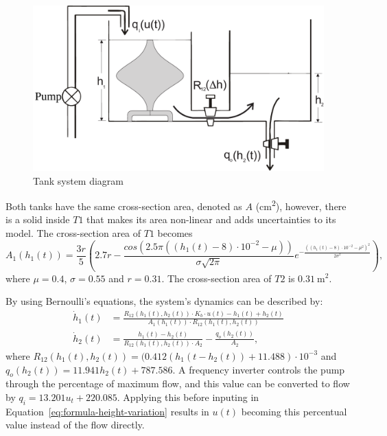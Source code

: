 \begin{figure}[ht!]
  \centering \captionsetup{justification=centering}
  \includegraphics[width=0.9\linewidth]{imgs/tanks}
  \caption{Tank system diagram}%
  \label{fig:tanks}
\end{figure}

Both tanks have the same cross-section area, denoted as \(A\)
(\si{\square\centi\metre}), however, there is a solid inside \(T1\) that makes its
area non-linear and adds uncertainties to its model. The cross-section area of
\(T1\) becomes
%
\begin{equation}
  \label{eq:t1-area}
  A_{1}(h_{1}(t)) = \frac{3r}{5} \left(
  2.7r - \frac{cos(2.5\pi{}((h_{1}(t)-8)\cdot{}10^{-2}-\mu))}{\sigma{}\sqrt{2\pi}}
  e^{-\frac{((h_{1}(t)-8)\cdot{}10^{-2}-\mu^{2})^{2}}{2\sigma^{2}}}
  \right),
\end{equation}
%
where \(\mu=0.4\), \(\sigma=0.55\) and \(r=0.31\). The cross-section area of \(T2\) is
\(\SI{0.31}{\square\metre}\).

By using Bernoulli's equations, the system's dynamics can be described by:
%
\begin{equation}
  \label{eq:formula-height-variation}
  \begin{aligned}
    \dot{h}_1(t) & = \frac{R_{12}(h_{1}(t),h_{2}(t))\cdot{}K_{b}\cdot{}u(t)-h_{1}(t)+h_{2}(t)}
    {A_{1}(h_{1}(t))\cdot{}R_{12}(h_{1}(t),h_{2}(t))}                                                                 \\
    \dot{h}_2(t) & = \frac{h_{1}(t)-h_{2}(t)}{R_{12}(h_{1}(t),h_{2}(t))\cdot{}A_{2}} - \frac{q_{o}(h_{2}(t))}{A_{2}},
  \end{aligned}
\end{equation}
%
where \(R_{12}(h_{1}(t),h_{2}(t))=(0.412(h_{1}(t-h_{2}(t))+11.488)\cdot{}10^{-3}\)
and \(q_{o}(h_{2}(t))=11.941h_{2}(t)+787.586\). A frequency inverter controls
the pump through the percentage of maximum flow, and this value can be converted
to flow by \(q_{i}=13.201u_{t}+220.085\). Applying this before inputing in
Equation~\eqref{eq:formula-height-variation} results in \(u(t)\) becoming this
percentual value instead of the flow directly.


